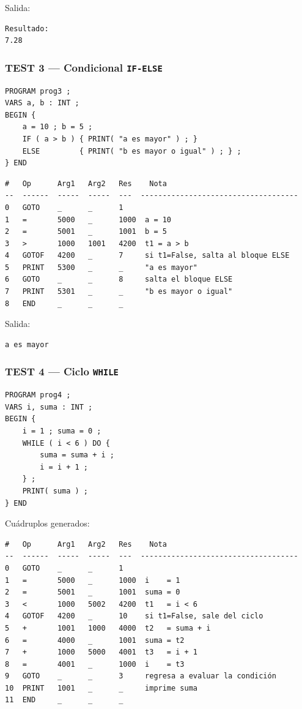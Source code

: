 \documentclass[12pt, letterpaper]{article}
\theoremstyle{definition}
\begin{document}
Salida:
\begin{verbatim}
Resultado:
7.28
\end{verbatim}

\subsubsection*{TEST 3 --- Condicional \texttt{IF-ELSE}}


\begin{verbatim}
PROGRAM prog3 ;
VARS a, b : INT ;
BEGIN {
    a = 10 ; b = 5 ;
    IF ( a > b ) { PRINT( "a es mayor" ) ; }
    ELSE         { PRINT( "b es mayor o igual" ) ; } ;
} END
\end{verbatim}

\begin{verbatim}
#   Op      Arg1   Arg2   Res    Nota
--  ------  -----  -----  ---  ------------------------------------
0   GOTO    _      _      1
1   =       5000   _      1000  a = 10
2   =       5001   _      1001  b = 5
3   >       1000   1001   4200  t1 = a > b
4   GOTOF   4200   _      7     si t1=False, salta al bloque ELSE
5   PRINT   5300   _      _     "a es mayor"
6   GOTO    _      _      8     salta el bloque ELSE
7   PRINT   5301   _      _     "b es mayor o igual"
8   END     _      _      _
\end{verbatim}

Salida:
\begin{verbatim}
a es mayor
\end{verbatim}

\subsubsection*{TEST 4 --- Ciclo \texttt{WHILE}}


\begin{verbatim}
PROGRAM prog4 ;
VARS i, suma : INT ;
BEGIN {
    i = 1 ; suma = 0 ;
    WHILE ( i < 6 ) DO {
        suma = suma + i ;
        i = i + 1 ;
    } ;
    PRINT( suma ) ;
} END
\end{verbatim}

Cuádruplos generados:
\begin{verbatim}
#   Op      Arg1   Arg2   Res    Nota
--  ------  -----  -----  ---  ------------------------------------
0   GOTO    _      _      1
1   =       5000   _      1000  i    = 1
2   =       5001   _      1001  suma = 0
3   <       1000   5002   4200  t1   = i < 6
4   GOTOF   4200   _      10    si t1=False, sale del ciclo
5   +       1001   1000   4000  t2   = suma + i
6   =       4000   _      1001  suma = t2
7   +       1000   5000   4001  t3   = i + 1
8   =       4001   _      1000  i    = t3
9   GOTO    _      _      3     regresa a evaluar la condición
10  PRINT   1001   _      _     imprime suma
11  END     _      _      _
\end{verbatim}
\end{document}
